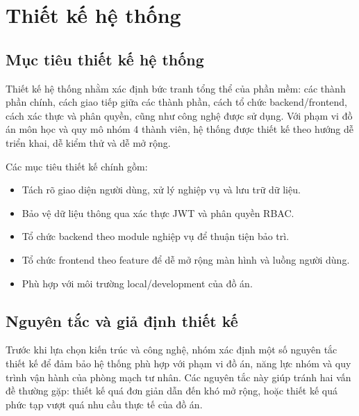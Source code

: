 \chapter{Thiết kế hệ thống}

\section{Mục tiêu thiết kế hệ thống}

Thiết kế hệ thống nhằm xác định bức tranh tổng thể của phần mềm: các thành phần chính, cách giao tiếp giữa các thành phần, cách tổ chức backend/frontend, cách xác thực và phân quyền, cũng như công nghệ được sử dụng. Với phạm vi đồ án môn học và quy mô nhóm 4 thành viên, hệ thống được thiết kế theo hướng dễ triển khai, dễ kiểm thử và dễ mở rộng.

Các mục tiêu thiết kế chính gồm:

\begin{itemize}
    \item Tách rõ giao diện người dùng, xử lý nghiệp vụ và lưu trữ dữ liệu.
    \item Bảo vệ dữ liệu thông qua xác thực JWT và phân quyền RBAC.
    \item Tổ chức backend theo module nghiệp vụ để thuận tiện bảo trì.
    \item Tổ chức frontend theo feature để dễ mở rộng màn hình và luồng người dùng.
    \item Phù hợp với môi trường local/development của đồ án.
\end{itemize}

\section{Nguyên tắc và giả định thiết kế}

Trước khi lựa chọn kiến trúc và công nghệ, nhóm xác định một số nguyên tắc thiết kế để đảm bảo hệ thống phù hợp với phạm vi đồ án, năng lực nhóm và quy trình vận hành của phòng mạch tư nhân. Các nguyên tắc này giúp tránh hai vấn đề thường gặp: thiết kế quá đơn giản dẫn đến khó mở rộng, hoặc thiết kế quá phức tạp vượt quá nhu cầu thực tế của đồ án.

